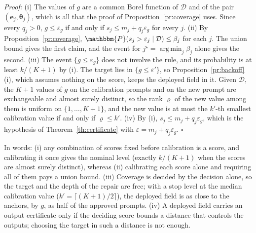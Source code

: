 \documentclass{article}
\DeclareMathOperator*{\argmin}{arg\,min}
\newcommand{\PP}{\mathbbm{P}}
\newcommand{\cD}{\mathcal{D}}
\newcommand{\bth}{\boldsymbol{\theta}}
\newcommand{\be}{\mathbf{e}}
\theoremstyle{plain}
\theoremstyle{remark}
\begin{document}
\textit{Proof:}
(i) The values of $g$ are a common Borel function of $\cD$ and of the pair $(\be_j,\bth_j)$, which is all that the proof of
Proposition~\ref{pr:coverage} uses. Since every $q_j>0$, $g\le\varepsilon_g$ if and only if $s_j\le m_j+q_j\varepsilon_g$ for every $j$.
(ii) By Proposition~\ref{pr:coverage}, $\PP(s_j>\varepsilon_j\mid\cD)\le\beta_j$ for each $j$. The union bound gives the first claim,
and the event for $j^\star=\argmin_j\beta_j$ alone gives the second.
(iii) The event $\{g\le\varepsilon_g\}$ does not involve the rule, and its probability is at least $k/(K+1)$ by (i). The target lies
in $\{g\le\varepsilon'\}$, so Proposition~\ref{pr:backoff}(i), which assumes nothing on the score, keeps the deployed field in it.
Given $\cD$, the $K+1$ values of $g$ on the calibration prompts and on the new prompt are exchangeable and almost surely distinct, so
the rank $\varrho$ of the new value among them is uniform on $\{1,\dots,K+1\}$, and the new value is at most the $k'$-th smallest
calibration value if and only if $\varrho\le k'$.
(iv) By (i), $s_j\le m_j+q_j\varepsilon_g$, which is the hypothesis of Theorem~\ref{th:certificate} with $\varepsilon=m_j+q_j\varepsilon_g$.
\hfill$\square$

In words: (i) any combination of scores fixed before calibration is a score, and calibrating it once gives the nominal level
(exactly $k/(K+1)$ when the scores are almost surely distinct), whereas (ii) calibrating each score alone and requiring all of them
pays a union bound. (iii) Coverage is decided by the
decision alone, so the target and the depth of the repair are free; with a stop level at the median calibration value
($k'=\lceil(K+1)/2\rceil$), the deployed field is as close to the anchors, by $g$, as half of the approved prompts. (iv) A deployed
field carries an output certificate only if the deciding score bounds a distance that controls the outputs; choosing the target in
such a distance is not enough.
\end{document}
